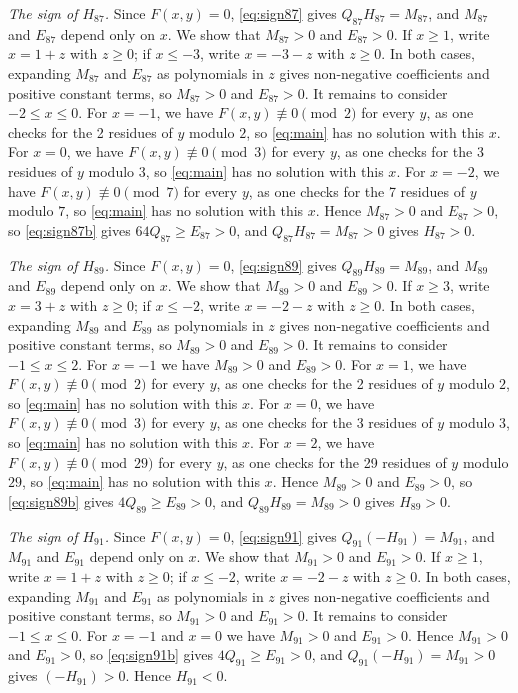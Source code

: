 \documentclass[11pt]{article}
\begin{document}
\emph{The sign of $H_{87}$.} Since $F(x,y)=0$, \eqref{eq:sign87} gives $Q_{87}H_{87}=M_{87}$, and $M_{87}$ and $E_{87}$ depend only on $x$. We show that $M_{87}>0$ and $E_{87}>0$. If $x\geq1$, write $x=1+z$ with $z\geq0$; if $x\leq-3$, write $x=-3-z$ with $z\geq0$. In both cases, expanding $M_{87}$ and $E_{87}$ as polynomials in $z$ gives non-negative coefficients and positive constant terms, so $M_{87}>0$ and $E_{87}>0$. It remains to consider $-2\leq x\leq0$. For $x=-1$, we have $F(x,y)\not\equiv0\pmod{2}$ for every $y$, as one checks for the 2 residues of $y$ modulo $2$, so \eqref{eq:main} has no solution with this $x$. For $x=0$, we have $F(x,y)\not\equiv0\pmod{3}$ for every $y$, as one checks for the 3 residues of $y$ modulo $3$, so \eqref{eq:main} has no solution with this $x$. For $x=-2$, we have $F(x,y)\not\equiv0\pmod{7}$ for every $y$, as one checks for the 7 residues of $y$ modulo $7$, so \eqref{eq:main} has no solution with this $x$. Hence $M_{87}>0$ and $E_{87}>0$, so \eqref{eq:sign87b} gives $64Q_{87}\geq E_{87}>0$, and $Q_{87}H_{87}=M_{87}>0$ gives $H_{87}>0$.

\emph{The sign of $H_{89}$.} Since $F(x,y)=0$, \eqref{eq:sign89} gives $Q_{89}H_{89}=M_{89}$, and $M_{89}$ and $E_{89}$ depend only on $x$. We show that $M_{89}>0$ and $E_{89}>0$. If $x\geq3$, write $x=3+z$ with $z\geq0$; if $x\leq-2$, write $x=-2-z$ with $z\geq0$. In both cases, expanding $M_{89}$ and $E_{89}$ as polynomials in $z$ gives non-negative coefficients and positive constant terms, so $M_{89}>0$ and $E_{89}>0$. It remains to consider $-1\leq x\leq2$. For $x=-1$ we have $M_{89}>0$ and $E_{89}>0$. For $x=1$, we have $F(x,y)\not\equiv0\pmod{2}$ for every $y$, as one checks for the 2 residues of $y$ modulo $2$, so \eqref{eq:main} has no solution with this $x$. For $x=0$, we have $F(x,y)\not\equiv0\pmod{3}$ for every $y$, as one checks for the 3 residues of $y$ modulo $3$, so \eqref{eq:main} has no solution with this $x$. For $x=2$, we have $F(x,y)\not\equiv0\pmod{29}$ for every $y$, as one checks for the 29 residues of $y$ modulo $29$, so \eqref{eq:main} has no solution with this $x$. Hence $M_{89}>0$ and $E_{89}>0$, so \eqref{eq:sign89b} gives $4Q_{89}\geq E_{89}>0$, and $Q_{89}H_{89}=M_{89}>0$ gives $H_{89}>0$.

\emph{The sign of $H_{91}$.} Since $F(x,y)=0$, \eqref{eq:sign91} gives $Q_{91}(-H_{91})=M_{91}$, and $M_{91}$ and $E_{91}$ depend only on $x$. We show that $M_{91}>0$ and $E_{91}>0$. If $x\geq1$, write $x=1+z$ with $z\geq0$; if $x\leq-2$, write $x=-2-z$ with $z\geq0$. In both cases, expanding $M_{91}$ and $E_{91}$ as polynomials in $z$ gives non-negative coefficients and positive constant terms, so $M_{91}>0$ and $E_{91}>0$. It remains to consider $-1\leq x\leq0$. For $x=-1$ and $x=0$ we have $M_{91}>0$ and $E_{91}>0$. Hence $M_{91}>0$ and $E_{91}>0$, so \eqref{eq:sign91b} gives $4Q_{91}\geq E_{91}>0$, and $Q_{91}(-H_{91})=M_{91}>0$ gives $(-H_{91})>0$. Hence $H_{91}<0$.
\end{document}

